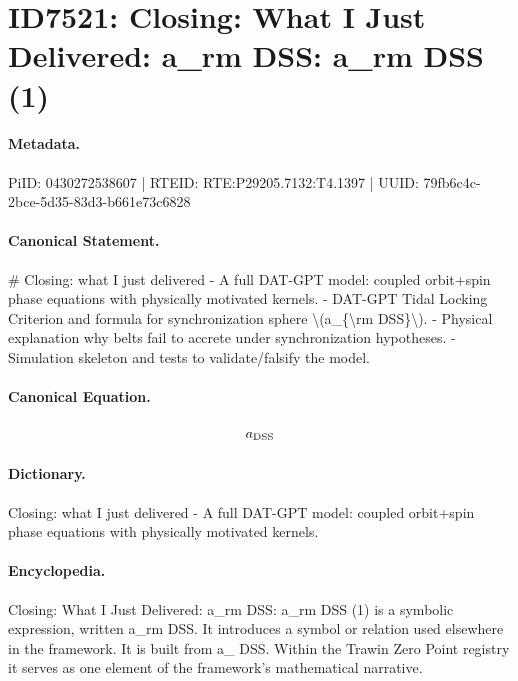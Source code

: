\section*{ID7521: Closing: What I Just Delivered: a\_rm DSS: a\_rm DSS (1)}
\paragraph{Metadata.}
PiID: 0430272538607 | RTEID: RTE:P29205.7132:T4.1397 | UUID: 79fb6c4c-2bce-5d35-83d3-b661e73c6828

\paragraph{Canonical Statement.}
\# Closing: what I just delivered - A full DAT-GPT model: coupled orbit+spin phase equations with physically motivated kernels. - DAT-GPT Tidal Locking Criterion and formula for synchronization sphere \textbackslash{}(a\_\{\textbackslash{}rm DSS\}\textbackslash{}). - Physical explanation why belts fail to accrete under synchronization hypotheses. - Simulation skeleton and tests to validate/falsify the model.

\paragraph{Canonical Equation.}
\[
a_{\rm DSS}
\]

\paragraph{Dictionary.}
Closing: what I just delivered - A full DAT-GPT model: coupled orbit+spin phase equations with physically motivated kernels.

\paragraph{Encyclopedia.}
Closing: What I Just Delivered: a\_rm DSS: a\_rm DSS (1) is a symbolic expression, written a\_rm DSS. It introduces a symbol or relation used elsewhere in the framework. It is built from a\_ DSS. Within the Trawin Zero Point registry it serves as one element of the framework's mathematical narrative.
